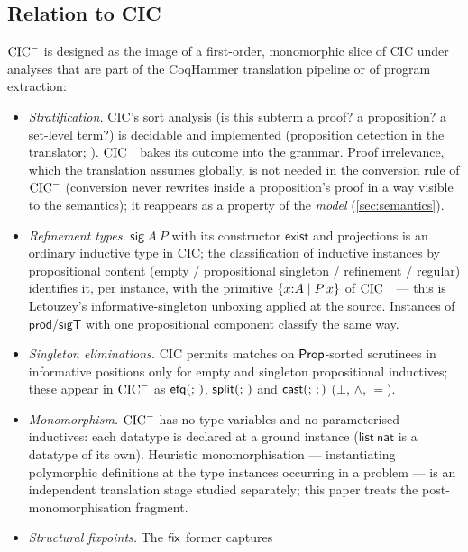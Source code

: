 \subsection{Relation to CIC}
\label{sec:calculus-cic}

$\mathrm{CIC}^{-}$ is designed as the image of a first-order, monomorphic slice of
CIC under analyses that are part of the CoqHammer translation pipeline or
of program extraction:

\begin{itemize}[leftmargin=2em]
\item \emph{Stratification.}  CIC's sort analysis (is this subterm a
  proof? a proposition? a set-level term?) is decidable and implemented
  (proposition detection in the translator; \cite[\S 4]{CzajkaKaliszyk2018}).
  $\mathrm{CIC}^{-}$ bakes its outcome into the grammar.  Proof irrelevance, which
  the translation assumes globally, is not needed in the conversion rule
  of $\mathrm{CIC}^{-}$ (conversion never rewrites inside a proposition's proof in a
  way visible to the semantics); it reappears as a property of the
  \emph{model} (\cref{sec:semantics}).
\item \emph{Refinement types.}  $\mathsf{sig}\ A\ P$ with its constructor
  $\mathsf{exist}$ and projections is an ordinary inductive type in CIC;
  the classification of inductive instances by propositional content
  (empty / propositional singleton / refinement / regular) identifies it,
  per instance, with the primitive $\{x{:}A \mid P\,x\}$ of $\mathrm{CIC}^{-}$ ---
  this is Letouzey's informative-singleton unboxing \cite[\S
  4.3]{Letouzey2004} applied at the source.  Instances of
  $\mathsf{prod}$/$\mathsf{sigT}$ with one propositional component
  classify the same way.
\item \emph{Singleton eliminations.}  CIC permits matches on
  $\mathsf{Prop}$-sorted scrutinees in informative positions only for empty and
  singleton propositional inductives; these appear in $\mathrm{CIC}^{-}$ as
  $\mathsf{efq}(;\,)$, $\mathsf{split}(;\,)$ and $\tcast{}{}$ ($\bot$, $\wedge$, $=$).
\item \emph{Monomorphism.}  $\mathrm{CIC}^{-}$ has no type variables and no
  parameterised inductives: each datatype is declared at a ground
  instance ($\mathsf{list\ nat}$ is a datatype of its own).  Heuristic
  monomorphisation --- instantiating polymorphic definitions at the type
  instances occurring in a problem --- is an independent translation stage
  studied separately; this paper treats the post-monomorphisation
  fragment.
\item \emph{Structural fixpoints.}  The $\mathsf{fix}$ former captures

\end{itemize}

